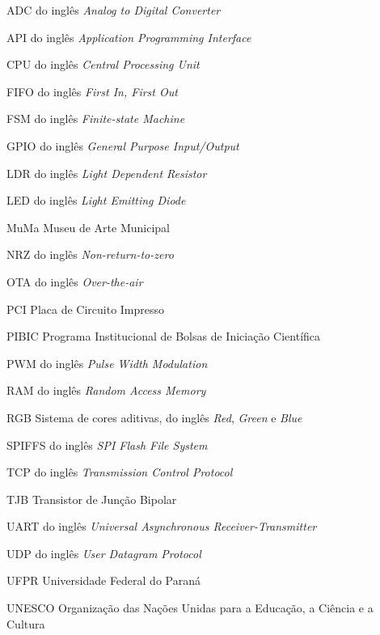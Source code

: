 \begin{siglas}
    \item[ADC] do inglês \emph{Analog to Digital Converter}
    \item[API] do inglês \emph{Application Programming Interface}
    \item[CPU] do inglês \emph{Central Processing Unit}
    \item[FIFO] do inglês \emph{First In, First Out}
    \item[FSM] do inglês \emph{Finite-state Machine}
    \item[GPIO] do inglês \emph{General Purpose Input/Output}
    \item[LDR] do inglês \emph{Light Dependent Resistor}
    \item[LED] do inglês \emph{Light Emitting Diode}
    \item[MuMa] Museu de Arte Municipal
    \item[NRZ] do inglês \emph{Non-return-to-zero}
    \item[OTA] do inglês \emph{Over-the-air}
    \item[PCI] Placa de Circuito Impresso
    \item[PIBIC] Programa Institucional de Bolsas de Iniciação Científica
    \item[PWM] do inglês \emph{Pulse Width Modulation}
    \item[RAM] do inglês \emph{Random Access Memory}
    \item[RGB] Sistema de cores aditivas, do inglês \emph{Red}, \emph{Green} e \emph{Blue}
    \item[SPIFFS] do inglês \emph{SPI Flash File System}
    \item[TCP] do inglês \emph{Transmission Control Protocol}
    \item[TJB] Transistor de Junção Bipolar
    \item[UART] do inglês \emph{Universal Asynchronous Receiver-Transmitter}
    \item[UDP] do inglês \emph{User Datagram Protocol}
    \item[UFPR] Universidade Federal do Paraná
    \item[UNESCO] Organização das Nações Unidas para a Educação, a Ciência e a Cultura
\end{siglas}

